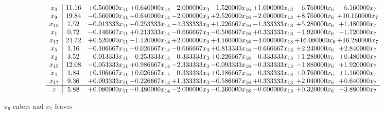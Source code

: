 \documentclass[10pt]{article}
\begin{document}
 \[\begin{array}{c| c c@{\hskip 2pt} c@{\hskip 2pt} c@{\hskip 2pt} c@{\hskip 2pt} c@{\hskip 2pt} c@{\hskip 2pt} c@{\hskip 2pt} }
 x_{8}   &  11.16 & + 0.560000 x_{11} & + 0.640000 x_{14} & -2.000000 x_{3} & -1.520000 x_{16} & + 1.000000 x_{13} & -6.760000 x_{6} & -6.160000 x_{7}\\
 x_{9}   &  19.84 & -0.560000 x_{11} & -0.640000 x_{14} & -2.000000 x_{3} & + 2.520000 x_{16} & -2.000000 x_{13} & + 8.760000 x_{6} & + 10.160000 x_{7}\\
 x_{10}   &  7.52 & -0.013333 x_{11} & -0.253333 x_{14} & -4.333333 x_{3} & + 1.226667 x_{16} & -1.333333 x_{13} & + 5.280000 x_{6} & + 1.480000 x_{7}\\
 x_{1}   &  0.72 & -0.146667 x_{11} & + 0.213333 x_{14} & -0.666667 x_{3} & -0.506667 x_{16} & + 0.333333 x_{13} & -1.920000 x_{6} & -1.720000 x_{7}\\
 x_{12}   &  24.72 & + 0.520000 x_{11} & -1.120000 x_{14} & + 2.000000 x_{3} & + 4.160000 x_{16} & -4.000000 x_{13} & + 16.080000 x_{6} & + 16.280000 x_{7}\\
 x_{5}   &  1.16 & -0.106667 x_{11} & -0.026667 x_{14} & -0.666667 x_{3} & + 0.813333 x_{16} & -0.666667 x_{13} & + 2.240000 x_{6} & + 2.840000 x_{7}\\
 x_{2}   &  3.52 & -0.013333 x_{11} & -0.253333 x_{14} & -0.333333 x_{3} & + 0.226667 x_{16} & -0.333333 x_{13} & + 1.280000 x_{6} & + 0.480000 x_{7}\\
 x_{15}   &  12.08 & -0.053333 x_{11} & + 0.986667 x_{14} & -2.333333 x_{3} & -0.093333 x_{16} & -0.333333 x_{13} & -1.880000 x_{6} & + 1.920000 x_{7}\\
 x_{4}   &  1.84 & + 0.106667 x_{11} & + 0.026667 x_{14} & -0.333333 x_{3} & + 0.186667 x_{16} & -0.333333 x_{13} & + 0.760000 x_{6} & + 1.160000 x_{7}\\
 x_{17}   &  9.36 & + 0.093333 x_{11} & -0.226667 x_{14} & + 1.333333 x_{3} & -0.586667 x_{16} & + 0.333333 x_{13} & + 2.040000 x_{6} & + 0.640000 x_{7}\\
\hline
z    &  5.88 & + 0.080000 x_{11} & -0.480000 x_{14} & -2.000000 x_{3} & -0.360000 x_{16} & -0.000000 x_{13} & + 0.320000 x_{6} & -3.880000 x_{7}\\
\end{array}\]


 $ x_{6} $ enters and $ x_{1} $ leaves 
\end{document}
